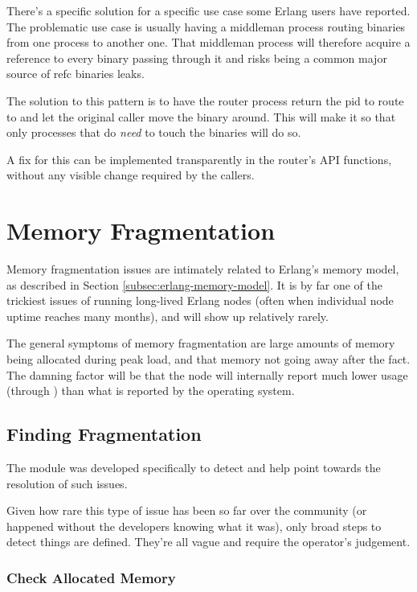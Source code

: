 \documentclass[11pt, oneside]{book}   	%
\begin{document}
There's a specific solution for a specific use case some Erlang users have reported. The problematic use case is usually having a middleman process routing binaries from one process to another one. That middleman process will therefore acquire a reference to every binary passing through it and risks being a common major source of refc binaries leaks.

The solution to this pattern is to have the router process return the pid to route to and let the original caller move the binary around. This will make it so that only processes that do \emph{need} to touch the binaries will do so.

A fix for this can be implemented transparently in the router's API functions, without any visible change required by the callers.

\section{Memory Fragmentation}
\label{sec:memory-fragmentation}

Memory fragmentation issues are intimately related to Erlang's memory model, as described in Section \ref{subsec:erlang-memory-model}. It is by far one of the trickiest issues of running long-lived Erlang nodes (often when individual node uptime reaches many months), and will show up relatively rarely.

The general symptoms of memory fragmentation are large amounts of memory being allocated during peak load, and that memory not going away after the fact. The damning factor will be that the node will internally report much lower usage (through ) than what is reported by the operating system.

\subsection{Finding Fragmentation}

The  module was developed specifically to detect and help point towards the resolution of such issues.

Given how rare this type of issue has been so far over the community (or happened without the developers knowing what it was), only broad steps to detect things are defined. They're all vague and require the operator's judgement.

\subsubsection{Check Allocated Memory}
\end{document}
